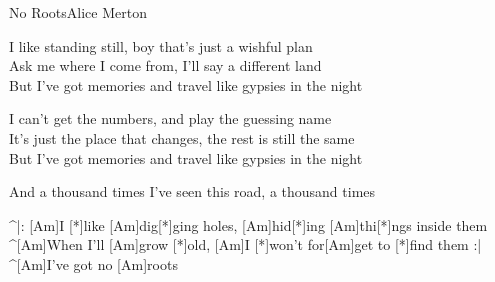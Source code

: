 \begin{song}{No Roots}{Alice Merton}
\begin{guitar}
I like standing still, boy that's just a wishful plan\\
Ask me where I come from, I'll say a different land\\
But I've got memories and travel like gypsies in the night\\
\end{guitar}

\begin{guitar}
I can't get the numbers, and play the guessing name\\
It's just the place that changes, the rest is still the same\\
But I've got memories and travel like gypsies in the night\\
\end{guitar}

\begin{guitar}
And a thousand times I've seen this road, a thousand times\\
\end{guitar}


\begin{guitar}
^|: [Am]\quad I [*]like [Am]dig[*]ging holes, [Am]\quad hid[*]ing [Am]thi[*]ngs inside them\\
^[Am]\quad [*]When I'll [Am]grow [*]old, [Am]\quad  I [*]won't for[Am]get to [*]find them :|\\
^[Am]\quad [*]I've got no [Am]roots\\
\end{guitar}



\end{song}
